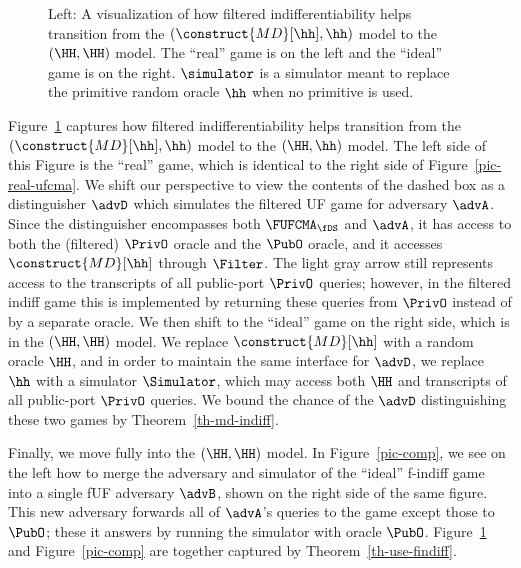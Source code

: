 \begin{figure}[t]
{
	}
	\vspace{-5pt}
	\caption{Left: A visualization of how filtered indifferentiability helps transition from the $(\construct{MD}[\hh], \hh)$ model to the $(\HH,\HH)$ model. The ``real'' game is on the left and the ``ideal'' game is on the right. $\simulator$ is a simulator meant to replace the primitive random oracle $\hh$ when no primitive is used.}
	\label{pic-indiff}
\end{figure}
Figure~\ref{pic-indiff} captures how filtered indifferentiability helps transition from the $(\construct{MD}[\hh], \hh)$ model to the $(\HH, \hh)$ model.
The left side of this Figure is the ``real'' game, which is identical to the right side of Figure~\ref{pic-real-ufcma}.
We shift our perspective to view the contents of the dashed box as a distinguisher $\advD$ which simulates the filtered UF game for adversary $\advA$.
Since the distinguisher encompasses both $\FUFCMA_{\fDS}$ and $\advA$, it has access to both the (filtered) $\PrivO$ oracle and the $\PubO$ oracle, and it accesses $\construct{MD}[\hh]$ through $\Filter$.
The light gray arrow still represents access to the transcripts of all public-port $\PrivO$ queries; however, in the filtered indiff game this is implemented by returning these queries from $\PrivO$ instead of by a separate oracle.
We then shift to the ``ideal'' game on the right side, which is in the $(\HH, \HH)$ model.
We replace $\construct{MD}[\hh]$ with a random oracle $\HH$, and in order to maintain the same interface for $\advD$, we replace $\hh$ with a simulator $\Simulator$, which may access  both $\HH$ and transcripts of all public-port $\PrivO$ queries.
We bound the chance of the $\advD$ distinguishing these two games by Theorem~\ref{th-md-indiff}.

Finally, we move fully into the $(\HH, \HH)$ model. In Figure~\ref{pic-comp}, we see on the left how to merge the adversary and simulator of the ``ideal'' f-indiff game into a single fUF adversary $\advB$, shown on the right side of the same figure.
This new adversary forwards all of $\advA$'s queries to the game except those to $\PubO$; these it answers by running the simulator with oracle $\PubO$.
Figure~\ref{pic-indiff} and  Figure~\ref{pic-comp} are together captured by Theorem~\ref{th-use-findiff}.


